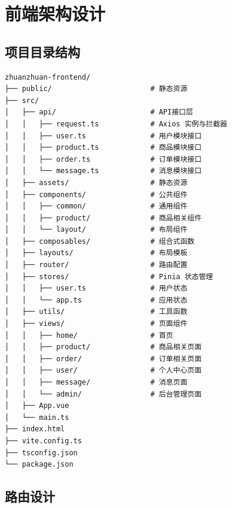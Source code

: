 \documentclass[12pt,a4paper,UTF8]{ctexart}
\begin{document}
\section{前端架构设计}

\subsection{项目目录结构}

\begin{lstlisting}[language={},breaklines=true]
zhuanzhuan-frontend/
├── public/                       # 静态资源
├── src/
│   ├── api/                      # API接口层
│   │   ├── request.ts            # Axios 实例与拦截器
│   │   ├── user.ts               # 用户模块接口
│   │   ├── product.ts            # 商品模块接口
│   │   ├── order.ts              # 订单模块接口
│   │   └── message.ts            # 消息模块接口
│   ├── assets/                   # 静态资源
│   ├── components/               # 公共组件
│   │   ├── common/               # 通用组件
│   │   ├── product/              # 商品相关组件
│   │   └── layout/               # 布局组件
│   ├── composables/              # 组合式函数
│   ├── layouts/                  # 布局模板
│   ├── router/                   # 路由配置
│   ├── stores/                   # Pinia 状态管理
│   │   ├── user.ts               # 用户状态
│   │   └── app.ts                # 应用状态
│   ├── utils/                    # 工具函数
│   ├── views/                    # 页面组件
│   │   ├── home/                 # 首页
│   │   ├── product/              # 商品相关页面
│   │   ├── order/                # 订单相关页面
│   │   ├── user/                 # 个人中心页面
│   │   ├── message/              # 消息页面
│   │   └── admin/                # 后台管理页面
│   ├── App.vue
│   └── main.ts
├── index.html
├── vite.config.ts
├── tsconfig.json
└── package.json
\end{lstlisting}

\subsection{路由设计}
\end{document}
